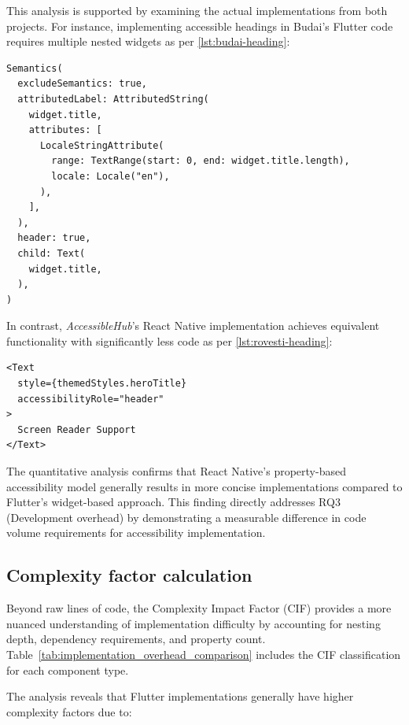 This analysis is supported by examining the actual implementations from both projects. For instance, implementing accessible headings in Budai's Flutter code requires multiple nested widgets as per \ref{lst:budai-heading}:

\begin{lstlisting}[style=DartStyle, caption=Heading implementation in Budai's Flutter code, label=lst:budai-heading]
Semantics(
  excludeSemantics: true,
  attributedLabel: AttributedString(
    widget.title,
    attributes: [
      LocaleStringAttribute(
        range: TextRange(start: 0, end: widget.title.length),
        locale: Locale("en"),
      ),
    ],
  ),
  header: true,
  child: Text(
    widget.title,
  ),
)
\end{lstlisting}

\pagebreak

In contrast, \textit{AccessibleHub}'s React Native implementation achieves equivalent functionality with significantly less code as per \ref{lst:rovesti-heading}:

\begin{lstlisting}[style=ReactNativeStyle, caption=Heading implementation in AccessibleHub's React Native code, label=lst:rovesti-heading]
<Text 
  style={themedStyles.heroTitle} 
  accessibilityRole="header"
>
  Screen Reader Support
</Text>
\end{lstlisting}

The quantitative analysis confirms that React Native's property-based accessibility model generally results in more concise implementations compared to Flutter's widget-based approach. This finding directly addresses RQ3 (Development overhead) by demonstrating a measurable difference in code volume requirements for accessibility implementation.

\subsection{Complexity factor calculation}
\label{subsec:complexity-calculation}

Beyond raw lines of code, the Complexity Impact Factor (CIF) provides a more nuanced understanding of implementation difficulty by accounting for nesting depth, dependency requirements, and property count. Table~\ref{tab:implementation_overhead_comparison} includes the CIF classification for each component type.

The analysis reveals that Flutter implementations generally have higher complexity factors due to:

